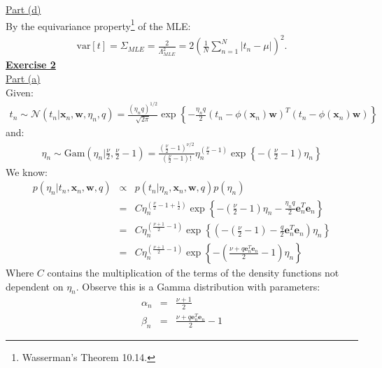 \documentclass[a4paper, 11pt]{article}
\begin{document}
\newline \underline{Part (d)}\\
\newline By the equivariance property\footnote{Wasserman's Theorem 10.14.} of the MLE:
\begin{eqnarray}
\text{var}[t] = \Sigma_{MLE} = \frac{2}{\Lambda_{MLE}^2} = 2 \left( \frac{1}{N} \sum_{n=1}^{N} | t_n - \mu | \right)^2. \nonumber
\end{eqnarray}
\newpage
\textbf{\underline{Exercise 2}}\\
\newline \underline{Part (a)}\\
\newline Given:
\begin{eqnarray}
t_n \sim \mathcal{N}(t_n | \mathbf{x}_n, \mathbf{w}, \eta_n, q) = \frac{(\eta_n q)^{1/2}}{\sqrt{2 \pi}} \exp \left\{ - \frac{\eta_n q}{2} (t_n - \phi(\mathbf{x}_n) \mathbf{w})^T (t_n - \phi(\mathbf{x}_n) \mathbf{w} ) \right\}  \nonumber
\end{eqnarray}
and:
\begin{eqnarray}
\eta_n \sim \text{Gam} \left(\eta_n | \frac{\nu}{2}, \frac{\nu}{2} - 1 \right) = \frac{\left( \frac{\nu}{2} - 1 \right)^{\nu/2}}{\left(\frac{\nu}{2} - 1 \right)!} \eta_n^{\left(\frac{\nu}{2} - 1 \right)} \exp \left\{ - \left(\frac{\nu}{2} - 1 \right) \eta_n \right\}   \nonumber
\end{eqnarray}
We know:
\begin{eqnarray}
p(\eta_n | t_n, \mathbf{x}_n, \mathbf{w}, q) &\propto& p(t_n | \eta_n, \mathbf{x}_n, \mathbf{w}, q) p(\eta_n)  \nonumber \\
&=& C \eta_n^{(\frac{\nu}{2} - 1 + \frac{1}{2})} \exp \left\{ - \left( \frac{\nu}{2}-1 \right) \eta_n - \frac{\eta_n q}{2} \mathbf{e}_n^T \mathbf{e}_n \right\} \nonumber \\
&=& C \eta_n^{(\frac{\nu + 1}{2} - 1)} \exp \left\{ \left( - \left( \frac{\nu}{2}-1 \right) - \frac{q}{2} \mathbf{e}_n^T \mathbf{e}_n \right) \eta_n \right\} \nonumber \\
&=& C \eta_n^{(\frac{\nu + 1}{2} - 1)} \exp \left\{ - \left( \frac{\nu + q \mathbf{e}_n^T \mathbf{e}_n}{2} - 1 \right) \eta_n \right\} \nonumber
\end{eqnarray}
Where $C$ contains the multiplication of the terms of the density functions not dependent on $\eta_n$. Observe this is a Gamma distribution with parameters:
\begin{eqnarray}
\alpha_n &=& \frac{\nu + 1}{2} \nonumber \\
\beta_n &=& \frac{\nu + q \mathbf{e}_n^T \mathbf{e}_n}{2} - 1 \nonumber
\end{eqnarray}
\end{document}
